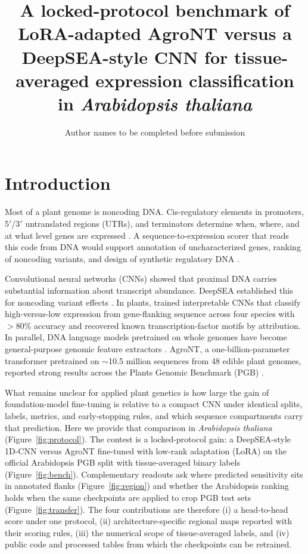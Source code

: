 \documentclass[9pt,twocolumn,twoside,lineno]{gsag3jnl}
\title{A locked-protocol benchmark of LoRA-adapted AgroNT versus a DeepSEA-style CNN for tissue-averaged expression classification in \emph{Arabidopsis thaliana}}
\author[$\ast$]{Author names to be completed before submission}
\affil[$\ast$]{Department of Plant Sciences, University Name, City, Country}
\begin{document}
\maketitle
\thispagestyle{firststyle}
\logomark
\articletypemark
\marginmark
\firstpagefootnote


\vspace{-34pt}

\section{Introduction}

Most of a plant genome is noncoding DNA. Cis-regulatory elements in promoters, 5$'$/3$'$ untranslated regions (UTRs), and terminators determine when, where, and at what level genes are expressed \citep{marand2023}. A sequence-to-expression scorer that reads this code from DNA would support annotation of uncharacterized genes, ranking of noncoding variants, and design of synthetic regulatory DNA \citep{hu2023}.

Convolutional neural networks (CNNs) showed that proximal DNA carries substantial information about transcript abundance. DeepSEA established this for noncoding variant effects \citep{zhou2015}. In plants, \citet{peleke2024} trained interpretable CNNs that classify high-versus-low expression from gene-flanking sequence across four species with $>$80\% accuracy and recovered known transcription-factor motifs by attribution. In parallel, DNA language models pretrained on whole genomes have become general-purpose genomic feature extractors \citep{avsec2021}. AgroNT, a one-billion-parameter transformer pretrained on $\sim$10.5 million sequences from 48 edible plant genomes, reported strong results across the Plants Genomic Benchmark (PGB) \citep{mendoza2024,pgb2024}.

What remains unclear for applied plant genetics is how large the gain of foundation-model fine-tuning is relative to a compact CNN under identical splits, labels, metrics, and early-stopping rules, and which sequence compartments carry that prediction. Here we provide that comparison in \emph{Arabidopsis thaliana} (Figure~\ref{fig:protocol}). The contest is a locked-protocol gain: a DeepSEA-style 1D-CNN versus AgroNT fine-tuned with low-rank adaptation (LoRA) on the official Arabidopsis PGB split with tissue-averaged binary labels (Figure~\ref{fig:bench}). Complementary readouts ask where predicted sensitivity sits in annotated flanks (Figure~\ref{fig:region}) and whether the Arabidopsis ranking holds when the same checkpoints are applied to crop PGB test sets (Figure~\ref{fig:transfer}). The four contributions are therefore (i) a head-to-head score under one protocol, (ii) architecture-specific regional maps reported with their scoring rules, (iii) the numerical scope of tissue-averaged labels, and (iv) public code and processed tables from which the checkpoints can be retrained.
\end{document}
